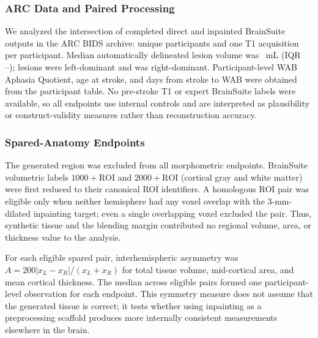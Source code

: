 \documentclass[runningheads]{llncs}
\begin{document}
\subsubsection{ARC Data and Paired Processing}
We analyzed the intersection of completed direct and inpainted BrainSuite outputs in the ARC BIDS archive: \ArcNMatched{} unique participants and one T1 acquisition per participant. Median automatically delineated lesion volume was \ArcLesionMedian{}~mL (IQR \ArcLesionQOne--\ArcLesionQThree); \ArcLeftDominant{} lesions were left-dominant and \ArcRightDominant{} was right-dominant. Participant-level WAB Aphasia Quotient, age at stroke, and days from stroke to WAB were obtained from the participant table. No pre-stroke T1 or expert BrainSuite labels were available, so all endpoints use internal controls and are interpreted as plausibility or construct-validity measures rather than reconstruction accuracy.





\subsubsection{Spared-Anatomy Endpoints}
The generated region was excluded from all morphometric endpoints. BrainSuite volumetric labels \(1000+\mathrm{ROI}\) and \(2000+\mathrm{ROI}\) (cortical gray and white matter) were first reduced to their canonical ROI identifiers. A homologous ROI pair was eligible only when neither hemisphere had any voxel overlap with the 3-mm-dilated inpainting target; even a single overlapping voxel excluded the pair. Thus, synthetic tissue and the blending margin contributed no regional volume, area, or thickness value to the analysis.

For each eligible spared pair, interhemispheric asymmetry was \(A=200|x_L-x_R|/(x_L+x_R)\) for total tissue volume, mid-cortical area, and mean cortical thickness. The median across eligible pairs formed one participant-level observation for each endpoint. This symmetry measure does not assume that the generated tissue is correct; it tests whether using inpainting as a preprocessing scaffold produces more internally consistent measurements elsewhere in the brain.
\end{document}
